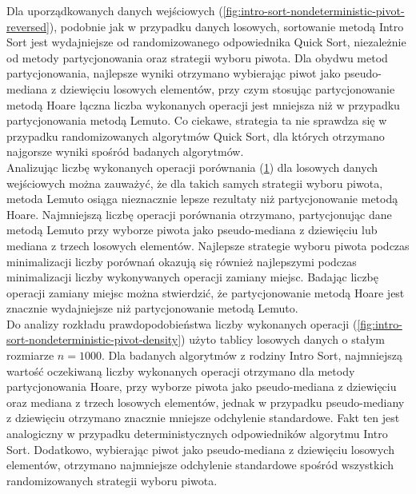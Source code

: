 Dla uporządkowanych danych wejściowych (\ref{fig:intro-sort-nondeterministic-pivot-reversed}), podobnie jak w przypadku danych losowych, sortowanie metodą Intro Sort jest wydajniejsze od randomizowanego odpowiednika Quick Sort, niezależnie od metody partycjonowania oraz strategii wyboru piwota. Dla obydwu metod partycjonowania, najlepsze wyniki otrzymano wybierając piwot jako pseudo-mediana z dziewięciu losowych elementów, przy czym stosując partycjonowanie metodą Hoare łączna liczba wykonanych operacji jest mniejsza niż w przypadku partycjonowania metodą Lemuto. Co ciekawe, strategia ta nie sprawdza się w przypadku randomizowanych algorytmów Quick Sort, dla których otrzymano najgorsze wyniki spośród badanych algorytmów.\\

Analizując liczbę wykonanych operacji porównania (\ref{fig:intro-sort-nondeterministic-pivot-random-all}) dla losowych danych wejściowych można zauważyć, że dla takich samych strategii wyboru piwota, metoda Lemuto osiąga nieznacznie lepsze rezultaty niż partycjonowanie metodą Hoare. Najmniejszą liczbę operacji porównania otrzymano, partycjonując dane metodą Lemuto przy wyborze piwota jako pseudo-mediana z dziewięciu lub mediana z trzech losowych elementów.
Najlepsze strategie wyboru piwota podczas minimalizacji liczby porównań okazują się również najlepszymi podczas minimalizacji liczby wykonywanych operacji zamiany miejsc. Badając liczbę operacji zamiany miejsc można stwierdzić, że partycjonowanie metodą Hoare jest znacznie wydajniejsze niż partycjonowanie metodą Lemuto.\\

Do analizy rozkładu prawdopodobieństwa liczby wykonanych operacji (\ref{fig:intro-sort-nondeterministic-pivot-density}) użyto tablicy losowych danych o stałym rozmiarze $n = 1000$. Dla badanych algorytmów z rodziny Intro Sort, najmniejszą wartość oczekiwaną liczby wykonanych operacji otrzymano dla metody partycjonowania Hoare, przy wyborze piwota jako pseudo-mediana z dziewięciu oraz mediana z trzech losowych elementów, jednak w przypadku pseudo-mediany z dziewięciu otrzymano znacznie mniejsze odchylenie standardowe. Fakt ten jest analogiczny w przypadku deterministycznych odpowiedników algorytmu Intro Sort. Dodatkowo, wybierając piwot jako pseudo-mediana z dziewięciu losowych elementów, otrzymano najmniejsze odchylenie standardowe spośród wszystkich randomizowanych strategii wyboru piwota.\\

\begin{figure}[]
	\centering
	
	\caption[]{}
	\label{fig:intro-sort-nondeterministic-pivot-random-all}
\end{figure}

